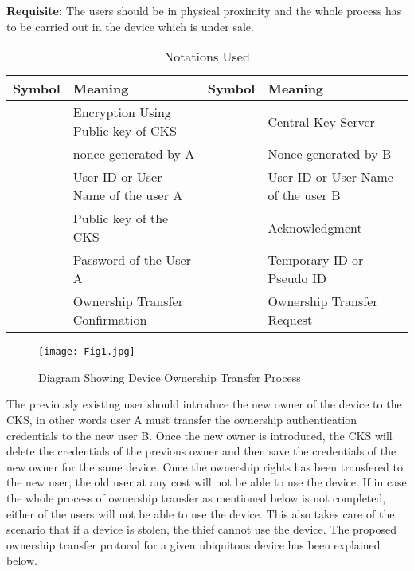 \documentclass[letterpaper]{article}
\begin{document}
\textbf{Requisite:} The users should be in physical proximity and the whole process has to be carried out in the device which is under sale.

\begin{table*}[bpht!]
\centering
	\caption{Notations Used} 
	\label{tab}
\begin{tabular}{|c|p{2in}|c|p{2in}|}
	\hline 
	\textbf{Symbol}&\textbf{Meaning}&\textbf{Symbol}&\textbf{Meaning} \\ \hline 
			
			&Encryption Using Public key of CKS&&Central Key Server\\ \hline 
			&nonce generated by A& &Nonce generated by B \\ \hline
			&User ID or User Name of the user A&&User ID or User Name of the user B\\ \hline 
			&Public key of the CKS&& Acknowledgment\\ \hline
			&Password of the User A&& Temporary ID or Pseudo ID\\ \hline 
			&Ownership Transfer Confirmation&&Ownership Transfer Request\\ \hline
		  
	\end{tabular}
\end{table*}	  


\begin{figure*}[bpht!]
\centering
\texttt{[image: Fig1.jpg]}
\caption{Diagram Showing Device Ownership Transfer Process}
\label{fig:1}
\end{figure*}
	
The previously existing user should introduce the new owner of the device to the CKS, in other words user A must transfer the ownership authentication credentials to the new user B. Once the new owner is introduced, the CKS will delete the credentials of the previous owner and then save the credentials of the new owner for the same device. Once the ownership rights has been transfered to the new user, the old user at any cost will not be able to use the device. If in case the whole process of ownership transfer as mentioned below is not completed, either of the users will not be able to use the device. This also takes care of the scenario that if a device is stolen, the thief cannot use the device. The proposed ownership transfer protocol for a given ubiquitous device has been explained below.
			
\end{document}
